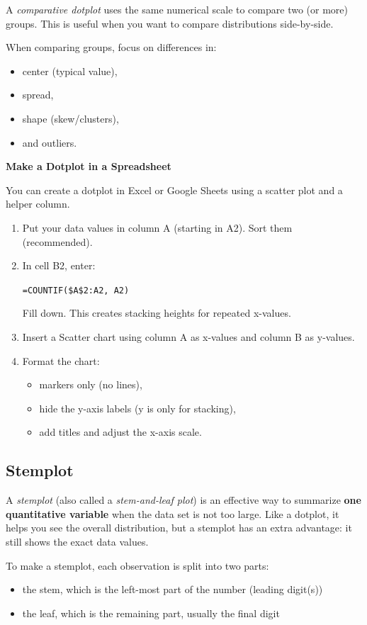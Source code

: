 A \textit{comparative dotplot} uses the same numerical scale to compare
two (or more) groups. This is useful when you want to compare distributions side-by-side.

When comparing groups, focus on differences in:
\begin{itemize}
    \item center (typical value),
    \item spread,
    \item shape (skew/clusters),
    \item and outliers.
\end{itemize}

\textbf{Make a Dotplot in a Spreadsheet}

You can create a dotplot in Excel or Google Sheets using a scatter plot and a helper column.

\begin{enumerate}
    \item Put your data values in column A (starting in A2). Sort them (recommended).
    \item In cell B2, enter:

    \texttt{=COUNTIF(\$A\$2:A2, A2)}

    Fill down. This creates stacking heights for repeated x-values.
    \item Insert a Scatter chart using column A as x-values and column B as y-values.
    \item Format the chart:
    \begin{itemize}
        \item markers only (no lines),
        \item hide the y-axis labels (y is only for stacking),
        \item add titles and adjust the x-axis scale.
    \end{itemize}
\end{enumerate}

\subsection{Stemplot}

A \textit{stemplot} (also called a \textit{stem-and-leaf plot}) is an effective way to summarize
\textbf{one quantitative variable} when the data set is not too large. Like a dotplot, it helps you see the
overall distribution, but a stemplot has an extra advantage: it still shows the exact data values.

To make a stemplot, each observation is split into two parts:
\begin{itemize}
    \item the stem, which is the left-most part of the number (leading digit(s))
    \item the leaf, which is the remaining part, usually the final digit
\end{itemize}

